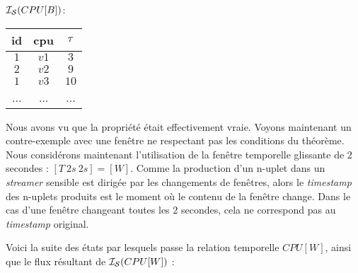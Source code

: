 \begin{example}
\begin{minipage}[c]{0.24\linewidth}
\begin{center}$\mathcal{I_S}(CPU[B])$: \\
\begin{tabular}{|c|c|c|}
\hline
id & cpu & $\tau$ \\ \hline
$1$ & $v1$ & $3$ \\ \hline
$2$ & $v2$ & $9$ \\ \hline
$1$ & $v3$ & $10$ \\ \hline
... & ... & ... \\ \hline
\end{tabular}\end{center}
\end{minipage} %

Nous avons vu que la propriété était effectivement vraie. Voyons maintenant un contre-exemple avec une fenêtre ne respectant pas les conditions du théorème. Nous considérons maintenant l'utilisation de la fenêtre temporelle glissante de $2$ secondes : $[T\ 2s\ 2s]=[W]$. Comme la production d'un n-uplet dans un \textit{streamer} sensible est dirigée par les changements de fenêtres, alors le \textit{timestamp} des n-uplets produits est le moment où le contenu de la fenêtre change. Dans le cas d'une fenêtre changeant toutes les $2$ secondes, cela ne correspond pas au \textit{timestamp} original.

Voici la suite des états par lesquels passe la relation temporelle $CPU[W]$, ainsi que le flux résultant de $\mathcal{I_S}(CPU[W])$ :


\end{example}
